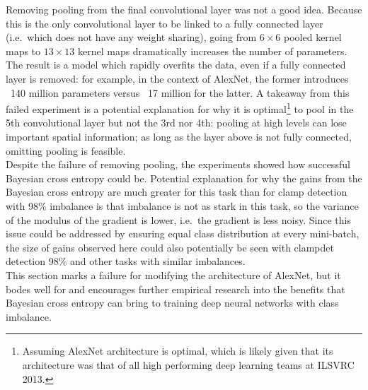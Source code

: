 \documentclass[a4paper,11pt]{article}
\begin{document}
Removing pooling from the final convolutional layer was not a good idea. Because this is the only convolutional layer to be linked to a fully connected layer (i.e.\ which does not have any weight sharing), going from $6\times6$ pooled kernel maps to $13\times13$ kernel maps dramatically increases the number of parameters. The result is a model which rapidly overfits the data, even if a fully connected layer is removed: for example, in the context of AlexNet, the former introduces ~140 million parameters versus ~17 million for the latter. A takeaway from this failed experiment is a potential explanation for why it is optimal\footnote{Assuming AlexNet architecture is optimal, which is likely given that its architecture was that of all high performing deep learning teams at ILSVRC 2013.} to pool in the 5th convolutional layer but not the 3rd nor 4th: pooling at high levels can lose important spatial information; as long as the layer above is not fully connected, omitting pooling is feasible. \\

Despite the failure of removing pooling, the experiments showed how successful Bayesian cross entropy could be. Potential explanation for why the gains from the Bayesian cross entropy are much greater for this task than for clamp detection with 98\% imbalance is that imbalance is not as stark in this task, so the variance of the modulus of the gradient is lower, i.e.\ the gradient is less noisy. Since this issue could be addressed by ensuring equal class distribution at every mini-batch, the size of gains observed here could also potentially be seen with clampdet detection 98\% and other tasks with similar imbalances. \\

This section marks a failure for modifying the architecture of AlexNet, but it bodes well for and encourages further empirical research into the benefits that Bayesian cross entropy can bring to training deep neural networks with class imbalance.
\end{document}
